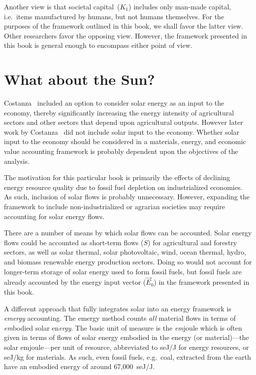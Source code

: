 Another view is that societal capital~($K_{1}$) 
includes only man-made capital, 
i.e.\ items manufactured by humans,
but not humans themselves. 
For the purposes of the framework outlined in this book, 
we shall favor the latter view.
Other researchers favor the opposing view.\cite{Giampietro2013}
However,
the framework presented in this book is general enough to encompass either point of view.


\section{What about the Sun?}
\label{sec:emergy}

Costanza~\cite{Costanza:1978vd} included an option to consider 
solar energy as an input to the economy, 
thereby significantly increasing the energy intensity 
of agricultural sectors and other sectors 
that depend upon agricultural outputs. 
However later work by Costanza~\cite{Costanza:1984tq,Costanza:1980ww} 
did not include solar input to the economy.
Whether solar input to the economy 
should be considered in a materials, energy, and economic value 
accounting framework is probably dependent upon 
the objectives of the analysis. 

The motivation for this particular book is primarily 
the effects of declining energy resource quality
due to fossil fuel depletion on industrialized economies. 
As such, inclusion of solar flows is probably unnecessary. 
However, expanding the framework to include non-industrialized 
or agrarian societies may require accounting for solar energy flows. 

There are a number of means by which solar flows can be accounted. 
Solar energy flows could be accounted as short-term flows ($\dot{S}$)
for agricultural and forestry sectors, 
as well as 
solar thermal, 
solar photovoltaic, 
wind, 
ocean thermal, 
hydro, and
biomass
renewable energy
production sectors.
Doing so would not account for longer-term storage
of solar energy used to form fossil fuels, 
but fossil fuels are already accounted by the energy input vector ($\vec{E}_{0}$)
in the framework presented in this book.

A different approach that fully integrates solar 
into an energy framework is \emph{emergy} accounting.
The emergy method counts \emph{all} material flows 
in terms of \emph{em}bodied solar en\emph{ergy}.\cite{Odum1975, Odum1996}
The basic unit of measure is 
the \emph{em}joule which is often given in terms 
of flows of solar energy embodied in 
the energy (or material)---the solar emjoule---per unit of resource, 
abbreviated to seJ/J for energy resources, 
or seJ/kg for materials. 
As such, even fossil fuels, e.g.\ coal, 
extracted from the earth have an embodied energy 
of around 67,000~seJ/J.\cite{Brown2004} 


